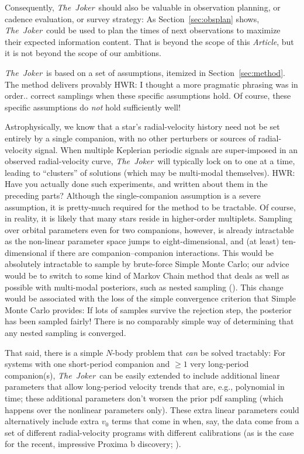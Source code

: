 \documentclass[manuscript, letterpaper]{aastex6}
\newcommand{\project}[1]{\textsl{#1}}
\newcommand{\samplername}{\project{The~Joker}}
\newcommand{\documentname}{\textsl{Article}}
\newcommand{\sectionname}{Section}
\begin{document}
Consequently,  \samplername\ should also be valuable in
observation planning, or cadence evaluation, or survey strategy:
As \sectionname~\ref{sec:obsplan} shows, \samplername\ could be used to plan the
times of next observations to maximize their expected information content.
That is beyond the scope of this \documentname, but it is not beyond the scope
of our ambitions.


\samplername\ is based on a set of assumptions, itemized in
\sectionname~\ref{sec:method}.
The method delivers provably {\color{red} HWR: I thought a more pragmatic phrasing was in order..}
correct samplings when these specific assumptions hold.
Of course, these specific assumptions do \emph{not} hold sufficiently well!

Astrophysically, we know that a star's radial-velocity history
need not be set entirely by a single companion, with no other perturbers or
sources of radial-velocity signal.
When multiple Keplerian periodic signals are super-imposed in an observed
radial-velocity curve, \samplername\ will typically lock on to one at a time,
leading to ``clusters'' of solutions (which may be multi-modal themselves).
 {\color{red} HWR: Have you actually done such experiments, and written about them in the preceding parts?}
Although the single-companion assumption is a severe assumption, it
is pretty-much required for the method to be tractable.
Of course, in reality, it is likely that many stars reside in higher-order
multiplets.
Sampling over orbital parameters even for two companions, however, is already
intractable as the non-linear parameter space jumps to eight-dimensional, and
(at least) ten-dimensional if there are companion--companion interactions.
This would be absolutely intractable to sample by brute-force Simple
Monte Carlo; our advice would be to switch to some kind of Markov
Chain method that deals as well as possible with multi-modal
posteriors, such as nested sampling (\citealt{Skilling:2004, Brewer:2009}).
This change would be associated with the loss of the simple
convergence criterion that Simple Monte Carlo provides: If lots of
samples survive the rejection step, the posterior has been sampled
fairly!
There is no comparably simple way of determining that any nested
sampling is converged.

That said, there is a simple $N$-body problem that \emph{can} be solved
tractably:
For systems with one short-period companion and $\geq1$ very long-period
companion(s), \samplername\ can be easily extended to include additional linear
parameters that allow long-period velocity trends that are, e.g., polynomial in
time; these additional parameters don't worsen the prior pdf sampling (which
happens over the nonlinear parameters only).
These extra linear parameters could alternatively include extra $v_0$ terms that
come in when, say, the data come from a set of different radial-velocity
programs with different calibrations (as is the case for the recent, impressive
Proxima b discovery; \citealt{Anglada-Escude:2016}).
\end{document}
